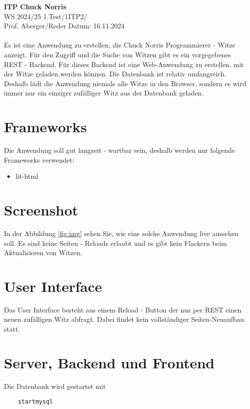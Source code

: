 \documentclass[a4paper, 11pt]{article}
\begin{document}
\noindent
\large\textbf{ITP} \hfill \textbf{Chuck Norris} \\
\normalsize WS 2024/25 \hfill 1.Test/1ITP2/\\
Prof. Aberger/Reder \hfill Datum: 16.11.2024\\
\\

\abstract{}
Es ist eine Anwendung zu erstellen, die Chuck Norris Programmierer - Witze anzeigt.
Für den Zugriff und die Suche von Witzen gibt es ein vorgegebenes REST - Backend.
Für dieses Backend ist eine Web-Anwendung zu erstellen, mit der Witze geladen werden können.
Die Datenbank ist relativ umfangreich. Deshalb lädt die Anwendung niemals alle Witze in den Browser,
sondern es wird immer nur ein einziger zufälliger Witz aus der Datenbank geladen.

\section{Frameworks}

Die Anwendung soll gut langzeit - wartbar sein, deshalb werden nur folgende Frameworks verwendet:
\begin{itemize}
	\item lit-html
\end{itemize}


\section{Screenshot}

In der Abbildung \ref{fig:img} sehen Sie, wie eine solche Anwendung live aussehen soll. Es sind keine Seiten - Reloads erlaubt und
es gibt kein Flackern beim Aktualisieren von Witzen.

\section{User Interface}
Das User Interface besteht aus einem Reload - Button der nur per REST einen neuen zufälligen Witz abfragt. Dabei findet kein vollständiger Seiten-Neuaufbau statt.

\section{Server, Backend und Frontend}
Die Datenbank wird gestartet mit

\begin{verbatim}
	startmysql
\end{verbatim}
\end{document}
